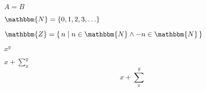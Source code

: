 \documentclass{article}
\begin{document}
$A = B$

$\mathbbm{N} = \{ 0, 1, 2, 3, \ldots \}$

$\mathbbm{Z} = \{ \, n \mid n \in \mathbbm{N} \wedge -n \in \mathbbm{N} \,\}$

$x^y$

$x + \sum_x^y$
\[x + \sum_x^y\]
\end{document}
